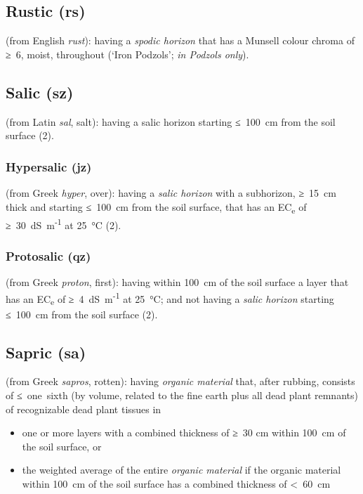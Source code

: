 \documentclass[
  letterpaper,
  DIV=11,
  numbers=noendperiod]{scrreprt}
\providecommand{\tightlist}{%
  \setlength{\itemsep}{0pt}\setlength{\parskip}{0pt}}\usepackage{longtable,booktabs,array}
\begin{document}
\hypertarget{rustic-rs}{%
\subsection{Rustic (rs)}\label{rustic-rs}}

(from English \emph{rust}): having a \emph{spodic horizon} that has a
Munsell colour chroma of ≥~6, moist, throughout (`Iron Podzols';
\emph{in Podzols only}).

\hypertarget{salic-sz}{%
\subsection{Salic (sz)}\label{salic-sz}}

(from Latin \emph{sal}, salt): having a salic horizon starting ≤~100~cm
from the soil surface (2).

\hypertarget{hypersalic-jz-1}{%
\subsubsection{Hypersalic (jz)}\label{hypersalic-jz-1}}

(from Greek \emph{hyper}, over): having a \emph{salic horizon} with a
subhorizon, ≥~15~cm thick and starting ≤~100~cm from the soil surface,
that has an EC\textsubscript{e} of ≥~30~dS~m\textsuperscript{-1} at
25~°C (2).

\hypertarget{protosalic-qz}{%
\subsubsection{Protosalic (qz)}\label{protosalic-qz}}

(from Greek \emph{proton}, first): having within 100~cm of the soil
surface a layer that has an EC\textsubscript{e} of
≥~4~dS~m\textsuperscript{-1} at 25~°C; and not having a \emph{salic
horizon} starting ≤~100~cm from the soil surface (2).

\hypertarget{sapric-sa}{%
\subsection{Sapric (sa)}\label{sapric-sa}}

(from Greek \emph{sapros}, rotten): having \emph{organic material} that,
after rubbing, consists of ≤~one~sixth (by volume, related to the fine
earth plus all dead plant remnants) of recognizable dead plant tissues
in

\begin{itemize}
\tightlist
\item
  one or more layers with a combined thickness of ≥~30 cm within 100~cm
  of the soil surface, or
\item
  the weighted average of the entire \emph{organic material} if the
  organic material within 100~cm of the soil surface has a combined
  thickness of \textless~60~cm
\end{itemize}
\end{document}
